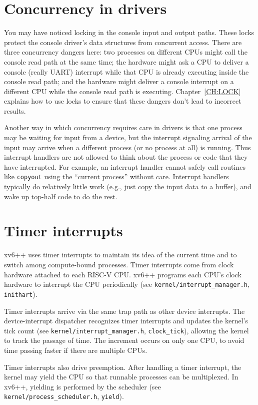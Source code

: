 \section{Concurrency in drivers}

You may have noticed locking in the console input and output paths.
These locks protect the console driver's data structures from concurrent access.
There are three concurrency dangers here: two processes on
different CPUs might call the console read path at the same time;
the hardware might ask a CPU to deliver a console (really
UART) interrupt while that CPU is already executing inside
the console read path;
and the hardware might deliver a console interrupt on
a different CPU while the console read path is executing.
Chapter~\ref{CH:LOCK} explains how to use locks
to ensure that these dangers don't lead to incorrect results.

Another way in which concurrency requires care in drivers is that one
process may be waiting for input from a device, but the interrupt
signaling arrival of the input may arrive when a different process (or
no process at all) is running. Thus interrupt handlers are not allowed
to think about the process or code that they have interrupted. For
example, an interrupt handler cannot safely call routines like
{\tt copyout} using the ``current process'' without care. Interrupt handlers typically do
relatively little work (e.g., just copy the input data to a buffer),
and wake up top-half code to do the rest.

\section{Timer interrupts}

xv6++ uses timer interrupts to maintain its idea of the
current time and to switch among compute-bound processes. Timer
interrupts come from clock hardware attached to each RISC-V CPU. xv6++
programs each CPU's clock hardware to interrupt the CPU periodically
(see \texttt{kernel/interrupt\_manager.h}, \texttt{inithart}).

Timer interrupts arrive via the same trap path as other device interrupts.
The device-interrupt dispatcher recognizes timer interrupts and updates the
kernel's tick count
(see \texttt{kernel/interrupt\_manager.h}, \texttt{clock\_tick}),
allowing the kernel to track the passage of time. The increment occurs on only
one CPU, to avoid time passing faster if there are multiple CPUs.

Timer interrupts also drive preemption. After handling a timer interrupt,
the kernel may yield the CPU so that runnable processes can be multiplexed.
In xv6++, yielding is performed by the scheduler
(see \texttt{kernel/process\_scheduler.h}, \texttt{yield}).

